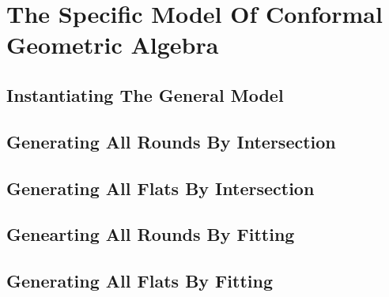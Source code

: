 
\chapter{The Specific Model Of Conformal Geometric Algebra}


\section{Instantiating The General Model}

\section{Generating All Rounds By Intersection}

\section{Generating All Flats By Intersection}

\section{Genearting All Rounds By Fitting}

\section{Generating All Flats By Fitting}